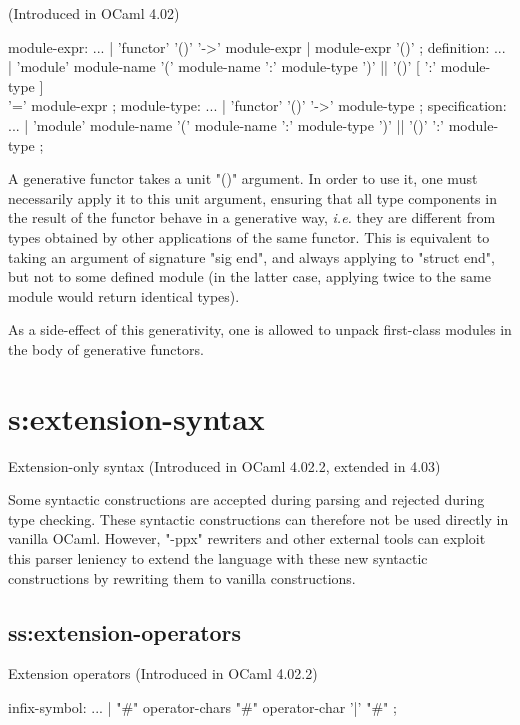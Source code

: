 {(Introduced in OCaml 4.02)

\begin{syntax}
module-expr:
          ...
        | 'functor' '()' '->' module-expr
        | module-expr '()'
;
definition:
          ...
        | 'module' module-name { '(' module-name ':' module-type ')' || '()' }
                   [ ':' module-type ] \\ '=' module-expr
;
module-type:
          ...
        | 'functor' '()' '->' module-type
;
specification:
          ...
        | 'module' module-name { '(' module-name ':' module-type ')' || '()' }
          ':' module-type
;
\end{syntax}

A generative functor takes a unit "()" argument.
In order to use it, one must necessarily apply it to this unit argument,
ensuring that all type components in the result of the functor behave
in a generative way, {\em i.e.} they are different from types obtained
by other applications of the same functor.
This is equivalent to taking an argument of signature "sig end", and always
applying to "struct end", but not to some defined module (in the
latter case, applying twice to the same module would return identical
types).

As a side-effect of this generativity, one is allowed to unpack
first-class modules in the body of generative functors.

\section{s:extension-syntax}{Extension-only syntax}
(Introduced in OCaml 4.02.2, extended in 4.03)

Some syntactic constructions are accepted during parsing and rejected
during type checking. These syntactic constructions can therefore not
be used directly in vanilla OCaml. However, "-ppx" rewriters and other
external tools can exploit this parser leniency to extend the language
with these new syntactic constructions by rewriting them to
vanilla constructions.
\subsection{ss:extension-operators}{Extension operators} \label{s:ext-ops}
(Introduced in OCaml 4.02.2)
\begin{syntax}
infix-symbol:
          ...
        | "#" {operator-chars} "#"  {operator-char '|' "#"}
;
\end{syntax}

}
